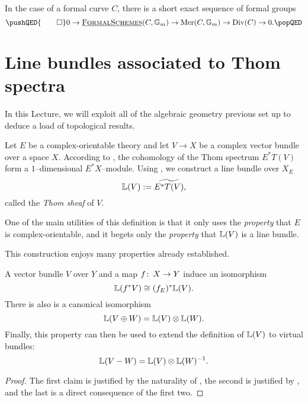 \begin{theorem}
In the case of a formal curve \(C\), there is a short exact sequence of formal groups
\[\pushQED{\qed}
0 \to \InternalHom{FormalSchemes}(C, \mathbb G_m) \to \operatorname{Mer}(C, \mathbb G_m) \to \Div(C) \to 0. \qedhere
\popQED\]
\end{theorem}











\section{Line bundles associated to Thom spectra}\label{ProjectivizationLecture}

In this Lecture, we will exploit all of the algebraic geometry previous set up to deduce a load of topological results.

\begin{definition}\label{DefnThomSheaf}
Let \(E\) be a complex-orientable theory and let \(V \to X\) be a complex vector bundle over a space \(X\).  According to , the cohomology of the Thom spectrum \(E^* T(V)\) form a \(1\)--dimensional \(E^* X\)--module.  Using , we construct a line bundle over \(X_E\) \[\mathbb{L}(V) := \widetilde{E^* T(V)},\] called the \textit{Thom sheaf} of \(V\).
\end{definition}

\begin{remark}
One of the main utilities of this definition is that it only uses the \emph{property} that \(E\) is complex-orientable, and it begets only the \emph{property} that \(\mathbb{L}(V)\) is a line bundle.
\end{remark}

This construction enjoys many properties already established.
\begin{corollary}\label{PropertiesOfThomSheaves}
A vector bundle \(V\) over \(Y\) and a map \(f \colon\thinspace X \to Y\) induce an isomorphism \[\mathbb{L}(f^* V) \cong (f_E)^* \mathbb{L}(V).\]  There is also is a canonical isomorphism \[\mathbb{L}(V \oplus W) = \mathbb{L}(V) \otimes \mathbb{L}(W).\]  Finally, this property can then be used to extend the definition of \(\mathbb{L}(V)\) to virtual bundles: \[\mathbb{L}(V - W) = \mathbb{L}(V) \otimes \mathbb{L}(W)^{-1}.\]
\end{corollary}
\begin{proof}
The first claim is justified by the naturality of , the second is justified by , and the last is a direct consequence of the first two.
\end{proof}

